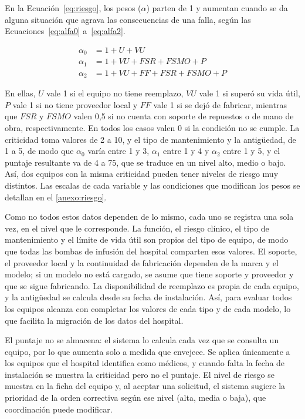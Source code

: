 \documentclass[10pt]{article}
\begin{document}
En la Ecuación~\eqref{eq:riesgo}, los pesos ($\alpha$) parten de 1 y aumentan cuando se da alguna situación que agrava las consecuencias de una falla, según las Ecuaciones~\eqref{eq:alfa0} a~\eqref{eq:alfa2}.

\begin{align}
\alpha_0 &= 1 + U + VU \label{eq:alfa0}\\
\alpha_1 &= 1 + VU + FSR + FSMO + P \label{eq:alfa1}\\
\alpha_2 &= 1 + VU + FF + FSR + FSMO + P \label{eq:alfa2}
\end{align}

En ellas, $U$ vale 1 si el equipo no tiene reemplazo, $VU$ vale 1 si superó su vida útil, $P$ vale 1 si no tiene proveedor local y $FF$ vale 1 si se dejó de fabricar, mientras que $FSR$ y $FSMO$ valen 0,5 si no cuenta con soporte de repuestos o de mano de obra, respectivamente. En todos los casos valen 0 si la condición no se cumple. La criticidad toma valores de 2 a 10, y el tipo de mantenimiento y la antigüedad, de 1 a 5, de modo que $\alpha_0$ varía entre 1 y 3, $\alpha_1$ entre 1 y 4 y $\alpha_2$ entre 1 y 5, y el puntaje resultante va de 4 a 75, que se traduce en un nivel alto, medio o bajo. Así, dos equipos con la misma criticidad pueden tener niveles de riesgo muy distintos. Las escalas de cada variable y las condiciones que modifican los pesos se detallan en el \ref{anexo:riesgo}.

Como no todos estos datos dependen de lo mismo, cada uno se registra una sola vez, en el nivel que le corresponde. La función, el riesgo clínico, el tipo de mantenimiento y el límite de vida útil son propios del tipo de equipo, de modo que todas las bombas de infusión del hospital comparten esos valores. El soporte, el proveedor local y la continuidad de fabricación dependen de la marca y el modelo; si un modelo no está cargado, se asume que tiene soporte y proveedor y que se sigue fabricando. La disponibilidad de reemplazo es propia de cada equipo, y la antigüedad se calcula desde su fecha de instalación. Así, para evaluar todos los equipos alcanza con completar los valores de cada tipo y de cada modelo, lo que facilita la migración de los datos del hospital.

El puntaje no se almacena: el sistema lo calcula cada vez que se consulta un equipo, por lo que aumenta solo a medida que envejece. Se aplica únicamente a los equipos que el hospital identifica como médicos, y cuando falta la fecha de instalación se muestra la criticidad pero no el puntaje. El nivel de riesgo se muestra en la ficha del equipo y, al aceptar una solicitud, el sistema sugiere la prioridad de la orden correctiva según ese nivel (alta, media o baja), que coordinación puede modificar.
\end{document}
